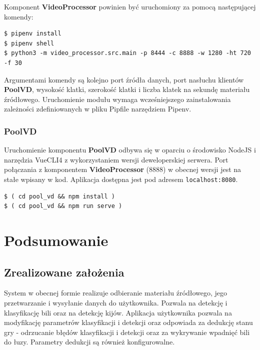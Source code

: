 \documentclass[12pt]{article}
\begin{document}
Komponent \textbf{VideoProcessor} powinien być uruchomiony za pomocą następującej komendy:

\begin{minipage}{\linewidth}

\begin{lstlisting}
$ pipenv install
$ pipenv shell
$ python3 -m video_processor.src.main -p 8444 -c 8888 -w 1280 -ht 720 -f 30
\end{lstlisting}
\end{minipage}

Argumentami komendy są kolejno port źródła danych, port nasłuchu klientów \textbf{PoolVD}, wysokość klatki, szerokość klatki i liczba klatek na sekundę materiału źródłowego. Uruchomienie modułu wymaga wcześniejszego zainstalowania zależności zdefiniowanych w pliku Pipfile narzędziem Pipenv.
\subsubsection{PoolVD}
Uruchomienie komponentu \textbf{PoolVD} odbywa się w oparciu o środowisko NodeJS i narzędzia VueCLI4 \cite{vuecli} z wykorzystaniem wersji deweloperskiej serwera. Port połączania z komponentem \textbf{VideoProcessor} (8888) w obecnej wersji jest na stałe wpisany w kod. Aplikacja dostępna jest pod adresem \lstinline{localhost:8080}.

\begin{minipage}{\linewidth}
\begin{lstlisting}
$ ( cd pool_vd && npm install )
$ ( cd pool_vd && npm run serve )
\end{lstlisting}
\end{minipage}

\section{Podsumowanie}

\subsection{Zrealizowane założenia}

System w obecnej formie realizuje odbieranie materiału źródłowego, jego przetwarzanie i wysyłanie danych do użytkownika. Pozwala na detekcję i klasyfikację bili oraz na detekcję kijów. Aplikacja użytkownika pozwala na modyfikację parametrów klasyfikacji i detekcji oraz odpowiada za dedukcję stanu gry - odrzucanie błędów klasyfikacji i detekcji oraz za wykrywanie wpadnięć bili do łuzy. Parametry dedukcji są również konfigurowalne.
\end{document}
